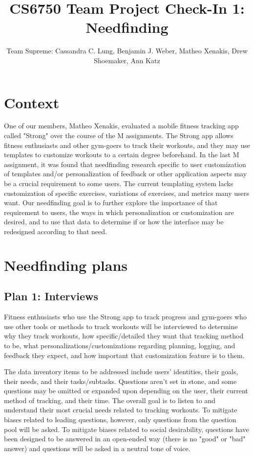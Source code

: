 \documentclass[
	letterpaper, %
]{jdf}
\author{Team Supreme: Cassandra C. Lung, Benjamin J. Weber, Matheo Xenakis, Drew Shoemaker, Ann Katz}
\title{CS6750 Team Project Check-In 1: Needfinding}
\begin{document}

\maketitle
\section{Context}
One of our members, Matheo Xenakis, evaluated a mobile fitness tracking app called "Strong" over the course of the M assignments. The Strong app allows fitness enthusiasts and other gym-goers to track their workouts, and they may use templates to customize workouts to a certain degree beforehand. In the last M assignment, it was found that needfinding research specific to user customization of templates and/or personalization of feedback or other application aspects may be a crucial requirement to some users. The current templating system lacks customization of specific exercises, variations of exercises, and metrics many users want. Our needfinding goal is to further explore the importance of that requirement to users, the ways in which personalization or customization are desired, and to use that data to determine if or how the interface may be redesigned according to that need.

\section{Needfinding plans}
\subsection{Plan 1: Interviews}
Fitness enthusiasts who use the Strong app to track progress and gym-goers who use other tools or methods to track workouts will be interviewed to determine why they track workouts, how specific/detailed they want that tracking method to be, what personalizations/customizations regarding planning, logging, and feedback they expect, and how important that customization feature is to them.

The data inventory items to be addressed include users' identities, their goals, their needs, and their tasks/subtasks. Questions aren't set in stone, and some questions may be omitted or expanded upon depending on the user, their current method of tracking, and their time. The overall goal is to listen to and understand their most crucial needs related to tracking workouts.
To mitigate biases related to leading questions, however, only questions from the question pool will be asked. To mitigate biases related to social desirability, questions have been designed to be answered in an open-ended way (there is no "good" or "bad" answer) and questions will be asked in a neutral tone of voice.
\end{document}
